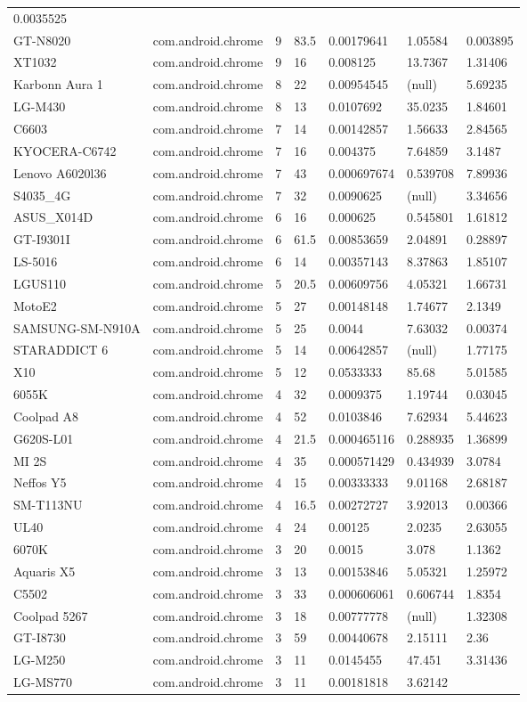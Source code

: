 \documentclass[
]{article}
\begin{document}
\begin{longtable}[]{@{}lllllll@{}}
0.0035525\tabularnewline
GT-N8020 & com.android.chrome & 9 & 83.5 & 0.00179641 & 1.05584 &
0.003895\tabularnewline
XT1032 & com.android.chrome & 9 & 16 & 0.008125 & 13.7367 &
1.31406\tabularnewline
Karbonn Aura 1 & com.android.chrome & 8 & 22 & 0.00954545 & (null) &
5.69235\tabularnewline
LG-M430 & com.android.chrome & 8 & 13 & 0.0107692 & 35.0235 &
1.84601\tabularnewline
C6603 & com.android.chrome & 7 & 14 & 0.00142857 & 1.56633 &
2.84565\tabularnewline
KYOCERA-C6742 & com.android.chrome & 7 & 16 & 0.004375 & 7.64859 &
3.1487\tabularnewline
Lenovo A6020l36 & com.android.chrome & 7 & 43 & 0.000697674 & 0.539708 &
7.89936\tabularnewline
S4035\_4G & com.android.chrome & 7 & 32 & 0.0090625 & (null) &
3.34656\tabularnewline
ASUS\_X014D & com.android.chrome & 6 & 16 & 0.000625 & 0.545801 &
1.61812\tabularnewline
GT-I9301I & com.android.chrome & 6 & 61.5 & 0.00853659 & 2.04891 &
0.28897\tabularnewline
LS-5016 & com.android.chrome & 6 & 14 & 0.00357143 & 8.37863 &
1.85107\tabularnewline
LGUS110 & com.android.chrome & 5 & 20.5 & 0.00609756 & 4.05321 &
1.66731\tabularnewline
MotoE2 & com.android.chrome & 5 & 27 & 0.00148148 & 1.74677 &
2.1349\tabularnewline
SAMSUNG-SM-N910A & com.android.chrome & 5 & 25 & 0.0044 & 7.63032 &
0.00374\tabularnewline
STARADDICT 6 & com.android.chrome & 5 & 14 & 0.00642857 & (null) &
1.77175\tabularnewline
X10 & com.android.chrome & 5 & 12 & 0.0533333 & 85.68 &
5.01585\tabularnewline
6055K & com.android.chrome & 4 & 32 & 0.0009375 & 1.19744 &
0.03045\tabularnewline
Coolpad A8 & com.android.chrome & 4 & 52 & 0.0103846 & 7.62934 &
5.44623\tabularnewline
G620S-L01 & com.android.chrome & 4 & 21.5 & 0.000465116 & 0.288935 &
1.36899\tabularnewline
MI 2S & com.android.chrome & 4 & 35 & 0.000571429 & 0.434939 &
3.0784\tabularnewline
Neffos Y5 & com.android.chrome & 4 & 15 & 0.00333333 & 9.01168 &
2.68187\tabularnewline
SM-T113NU & com.android.chrome & 4 & 16.5 & 0.00272727 & 3.92013 &
0.00366\tabularnewline
UL40 & com.android.chrome & 4 & 24 & 0.00125 & 2.0235 &
2.63055\tabularnewline
6070K & com.android.chrome & 3 & 20 & 0.0015 & 3.078 &
1.1362\tabularnewline
Aquaris X5 & com.android.chrome & 3 & 13 & 0.00153846 & 5.05321 &
1.25972\tabularnewline
C5502 & com.android.chrome & 3 & 33 & 0.000606061 & 0.606744 &
1.8354\tabularnewline
Coolpad 5267 & com.android.chrome & 3 & 18 & 0.00777778 & (null) &
1.32308\tabularnewline
GT-I8730 & com.android.chrome & 3 & 59 & 0.00440678 & 2.15111 &
2.36\tabularnewline
LG-M250 & com.android.chrome & 3 & 11 & 0.0145455 & 47.451 &
3.31436\tabularnewline
LG-MS770 & com.android.chrome & 3 & 11 & 0.00181818 & 3.62142 &

\end{longtable}
\end{document}
